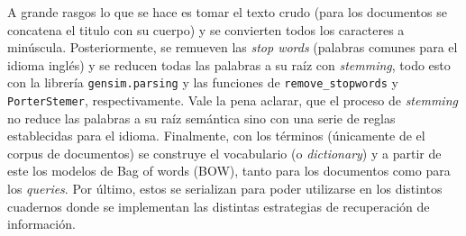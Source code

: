 A grande rasgos lo que se hace es tomar el texto crudo (para los documentos se concatena el titulo con su cuerpo) y se convierten todos los caracteres a minúscula. Posteriormente, se remueven las \textit{stop words} (palabras comunes para el idioma inglés) y se reducen todas las palabras a su raíz con \textit{stemming}, todo esto con la librería \texttt{gensim.parsing} y las funciones de \texttt{remove\_stopwords} y \texttt{PorterStemer}, respectivamente. Vale la pena aclarar, que el proceso de \textit{stemming} no reduce las palabras a su raíz semántica sino con una serie de reglas establecidas para el idioma. Finalmente, con los términos (únicamente de el corpus de documentos) se construye el vocabulario (o \textit{dictionary}) y a partir de este los modelos de Bag of words (BOW), tanto para los documentos como para los \textit{queries}. Por último, estos se serializan para poder utilizarse en los distintos cuadernos donde se implementan las distintas estrategias de recuperación de información.